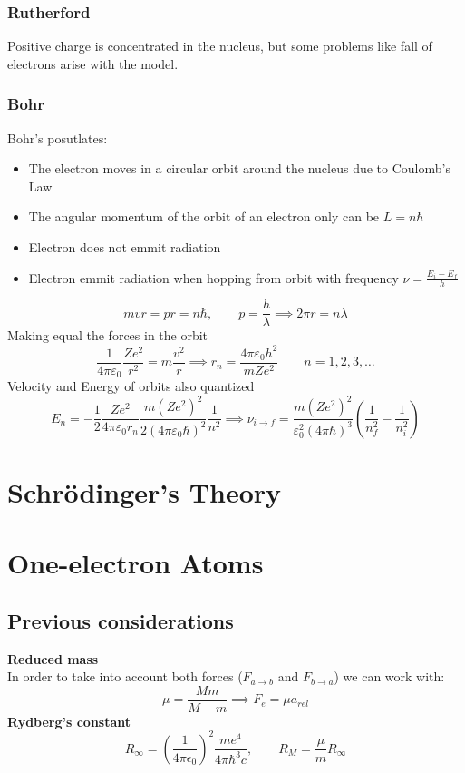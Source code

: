 \documentclass{myclass}
\begin{document}
\subsubsection{Rutherford}
Positive charge is concentrated in the nucleus, but some problems like fall of electrons arise with the model.

\subsubsection{Bohr}
Bohr's posutlates:
\begin{itemize}
    \item The electron moves in a circular orbit around the nucleus due to Coulomb's Law
    \item The angular momentum of the orbit of an electron only can be $L=n\hbar$
    \item Electron does not emmit radiation
    \item Electron emmit radiation when hopping from orbit with frequency $\nu = \frac{E_i-E_f}{h}$
\end{itemize}
$$
mvr = pr = n\hbar, \qquad p = \frac{h}{\lambda} \implies \boxed{2\pi r=n\lambda}
$$
Making equal the forces in the orbit
$$
\frac{1}{4\pi\varepsilon_0}\frac{Ze^2}{r^2}=m\frac{v^2}{r} \implies \boxed{r_n = \frac{4\pi \varepsilon_0h^2}{mZe^2} \qquad n=1, 2, 3, \ldots}
$$
Velocity and Energy of orbits also quantized
$$
E_n = -\frac{1}{2} \frac{Ze^2}{4\pi \varepsilon_0r_n}
\frac{m(Ze^2)^2}{2(4\pi \varepsilon_0\hbar)^2}\frac{1}{n^2} 
\implies \boxed{\nu_{i\to f} = \frac{m(Ze^2)^2}{\varepsilon_0^2(4\pi \hbar)^3}\left(\frac{1}{n_f^2} - \frac{1}{n_i^2}\right)}
$$


\section{Schrödinger's Theory}

\section{One-electron Atoms}
\subsection{Previous considerations}
\textbf{Reduced mass}\\
In order to take into account both forces ($F_{a\to b}$ and $F_{b\to a}$) we can work with:
$$
\mu = \frac{Mm}{M+m} \implies F_e = \mu a_{rel}
$$
\textbf{Rydberg's constant}
$$
R_\infty = \left( \frac{1}{4\pi \epsilon_0}\right)^2\frac{me^4}{4\pi \hbar^3 c}, \qquad R_M = \frac{\mu}{m}R_\infty 
$$
\end{document}
